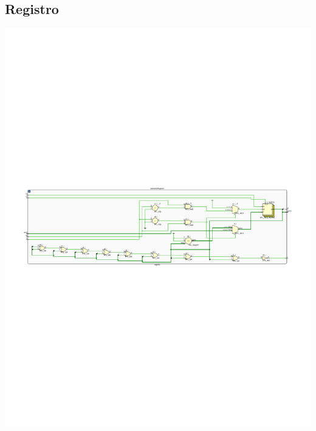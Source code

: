 \documentclass[8pt,executivepaper]{article}
\begin{document}
\subsection{Registro}
\begin{center}
  \includegraphics[scale=0.7]{rtl/registro.pdf}
\end{center}
\end{document}

